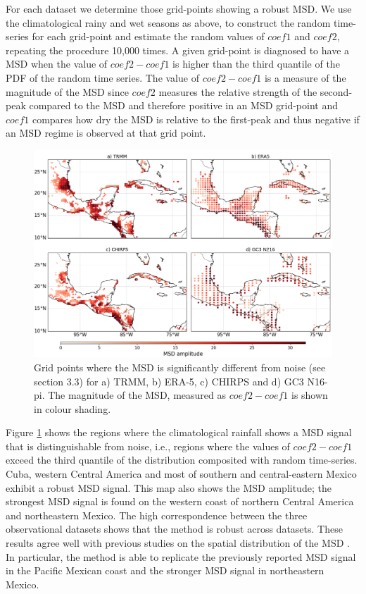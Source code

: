 For each dataset we determine those grid-points showing a robust MSD. We use the climatological rainy and wet seasons as above, to construct the random time-series for each grid-point and estimate the random values of $coef1$ and $coef2$, repeating the procedure 10,000 times. A given grid-point is diagnosed to have a MSD when the value of $coef2-coef1$ is higher than the third quantile of the PDF of the random time series. The value of $coef2-coef1$ is a measure of the magnitude of the MSD since $coef2$ measures the relative strength of the second-peak compared to the MSD and therefore positive in an MSD grid-point and $coef1$ compares how dry the MSD is relative to the first-peak and thus negative if an MSD regime is observed at that grid point. 

\begin{figure}[t!]
\centering
\includegraphics[width=\linewidth]{figures/wav_fig12.png}
\caption[Map of MSD significant regions]{Grid points where the MSD is significantly different from noise (see section 3.3) for a) TRMM, b) ERA-5, c) CHIRPS and d) GC3 N16-pi.  The magnitude of the MSD, measured as $coef2-coef1$ is shown in colour shading.  }
\label{fig:wavfinalmap}
\end{figure}

Figure \ref{fig:wavfinalmap} shows the regions where the climatological rainfall shows a MSD signal that is distinguishable from noise, i.e., regions where the values of $coef2-coef1$ exceed the third quantile of the distribution composited with random time-series. Cuba, western Central America and most of southern and central-eastern Mexico exhibit a robust MSD signal. 
This map also shows the MSD amplitude; the strongest MSD signal is found on the western coast of northern Central America and northeastern Mexico. 
The high correspondence between the three observational datasets shows that the method is robust across datasets. These results agree well with previous studies on the spatial distribution of the MSD \citep{magana1999,perdigon2018,anderson2019multiscale,zhao2021}. In particular, the method is able to replicate the previously reported MSD signal in the Pacific Mexican coast and the stronger MSD signal in northeastern Mexico.  

